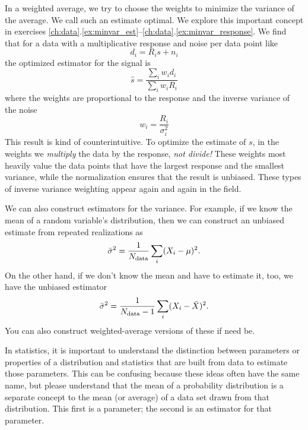 In a weighted average, we try to choose the weights to minimize the variance of the average.  We call such an estimate optimal.  We explore this important concept in exercises \ref{ch:data}.\ref{ex:minvar_est}--\ref{ch:data}.\ref{ex:minvar_response}.  We find that for a data with a multiplicative response and noise per data point like
\begin{equation}
  d_i = R_i s + n_i
\end{equation}
the optimized estimator for the signal is
\begin{equation}
  \hat s = \frac{\sum_i w_i d_i}{\sum_i w_i R_i}
\end{equation}
where the weights are proportional to the response and the inverse variance of the noise
\begin{equation}
  w_i = \frac{R_i}{\sigma_i^2}
\end{equation}
This result is kind of counterintuitive.  To optimize the estimate of $s$, in the weights we \textit{multiply} the data by the response, \textit{not divide!}  These weights most heavily value the data points that have the largest response and the smallest variance, while the normalization ensures that the result is unbiased.  These types of inverse variance weighting appear again and again in the field.

We can also construct estimators for the variance.  For example, if we know the mean of a random variable's distribution, then we can construct an unbiased estimate from repeated realizations as
\begin{equation}
  \bar \sigma^2 = \frac{1}{N_{\rm data}} \sum_i (X_i - \mu)^2.
\end{equation}
On the other hand, if we don't know the mean and have to estimate it, too, we have the unbiased estimator
\begin{equation}
  \bar \sigma^2 = \frac{1}{N_{\rm data}-1} \sum_i (X_i - \bar X)^2.
\end{equation}
You can also construct weighted-average versions of these if need be.

In statistics, it is important to understand the distinction between parameters or properties of a distribution and statistics that are built from data to estimate those parameters.  This can be confusing because these ideas often have the same name, but please understand that the mean of a probability distribution is a separate concept to the mean (or average) of a data set drawn from that distribution.  This first is a parameter; the second is an estimator for that parameter.

